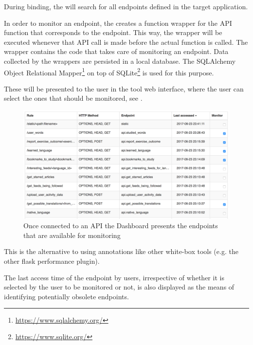 \documentclass[conference]{IEEEtran}
\begin{document}
  During binding, the \tool will search for all endpoints defined in the target application. 

  In order to monitor an endpoint, the \tool creates a function wrapper for the API function that corresponds to the endpoint. This way, the wrapper will be executed whenever that API call is made before the actual function is called. The wrapper contains the code that takes care of monitoring an endpoint. Data collected by the wrappers are persisted in a local database. The SQLAlchemy Object Relational Mapper\footnote{\url{https://www.sqlalchemy.org/}} on top of SQLite\footnote{\url{https://www.sqlite.org/}} is used for this purpose.


  These will be presented to the user in the tool web interface, where the user can select the ones that should be monitored, see . 

    \begin{figure}[h!]
      \centering
      \includegraphics[width=\linewidth]{selecting_endpoints.png}
      \caption{Once connected to an API the Dashboard presents the endpoints that are available for monitoring}
      \label{fig:sep}
    \end{figure}

  This is the alternative to using annotations like other white-box tools (e.g. the other flask performance plugin). 



   The last access time of the endpoint by users, irrespective of whether it is selected by the user to be monitored or not, is also displayed as the means of identifying potentially obsolete endpoints.



\end{document}
